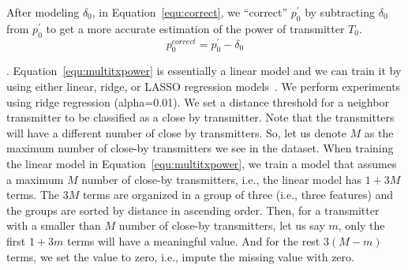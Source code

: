 After modeling $\delta_0$, in Equation~\ref{equ:correct}, we ``correct'' $p_0^{'}$ by subtracting $\delta_0$ from $p_0^{'}$ to get a more accurate estimation of the power of transmitter $T_0$.
\begin{equation}
    p_{0}^{correct} = p_{0}^{'} - \delta_0
    \label{equ:correct}
\end{equation}

.
Equation~\ref{equ:multitxpower} is essentially a linear model and we can train it by using either linear, ridge, or LASSO regression models~\cite{scikit-learn}.
We perform experiments using ridge regression (alpha=0.01). 
We set a distance threshold for a neighbor transmitter to be classified as a close by transmitter. 
Note that the transmitters will have a different number of close by transmitters. 
So, let us denote $M$ as the maximum number of close-by transmitters we see in the dataset.
When training the linear model in Equation~\ref{equ:multitxpower}, we train a model that assumes a maximum $M$ number of close-by transmitters, i.e., the linear model has $1+3M$ terms.
The $3M$ terms are organized in a group of three (i.e., three features) and the groups are sorted by distance in ascending order.
Then, for a transmitter with a smaller than $M$ number of close-by transmitters, let us say $m$, only the first $1+3m$ terms will have a meaningful value.
And for the rest $3(M-m)$ terms, we set the value to zero, i.e., impute the missing value with zero.